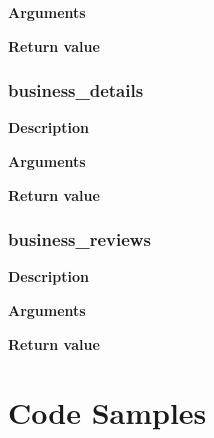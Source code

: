 \documentclass[11pt]{article}
\begin{document}
\textbf{Arguments}
\begin{deflist}
	\item[]
\end{deflist}

\textbf{Return value}

\subsubsection{business\_details}
\textbf{Description}

\textbf{Arguments}
\begin{deflist}
	\item[]
\end{deflist}

\textbf{Return value}

\subsubsection{business\_reviews}
\textbf{Description}

\textbf{Arguments}
\begin{deflist}
	\item[]
\end{deflist}

\textbf{Return value}

\pagebreak

\section{Code Samples}
\subsection{}
\end{document}
